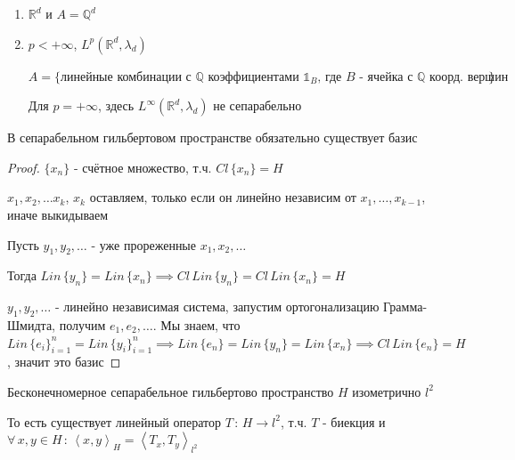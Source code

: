 \begin{example}
    \begin{enumerate}
        \item {
            $\mathbb{R}^d$ и $A = \mathbb{Q}^d$
        }
        \item {
            $p < +\infty$, $L^p (\mathbb{R}^d, \lambda_d)$

            $A = \{ \text{линейные комбинации с $\mathbb{Q}$ коэффициентами $\mathds{1}_B$, где $B$ - ячейка с $\mathbb{Q}$ коорд. вершин} \} $

            Для $p = +\infty$, здесь $L^\infty (\mathbb{R}^d, \lambda_d)$ не сепарабельно
        }
    \end{enumerate}
\end{example}

\begin{theorem}
    В сепарабельном гильбертовом пространстве обязательно существует базис
\end{theorem}

\begin{proof}
    $\{ x_n \}$ - счётное множество, т.ч. $Cl \, \{ x_n \} = H$

    $x_1, x_2, \ldots x_k$, $x_k$ оставляем, только если он линейно независим от $x_1, \ldots, x_{k - 1}$, иначе выкидываем

    Пусть $y_1, y_2, \ldots$ - уже прореженные $x_1, x_2, \ldots$

    Тогда $Lin \, \{ y_n \} = Lin \, \{ x_n \} \implies Cl \, Lin \, \{ y_n \} = Cl \, Lin \, \{ x_n \} = H$

    $y_1, y_2, \ldots$ - линейно независимая система, запустим ортогонализацию Грамма-Шмидта, получим $e_1, e_2, \ldots$.
    Мы знаем, что $Lin \, \{ e_i \}_{i = 1}^n = Lin \, \{ y_i \}_{i = 1}^n \implies Lin \, \{ e_n \} = Lin \, \{ y_n \} = Lin \, \{ x_n \} \implies Cl \, Lin \, \{e_n \} = H$, значит это базис
\end{proof}

\begin{theorem}
    Бесконечномерное сепарабельное гильбертово пространство $H$ изометрично $l^2$

    То есть существует линейный оператор $T \, : \, H \to l^2$, т.ч. $T$ - биекция и $\forall \, x, y \in H \, : \, \left < x, y \right >_H = \left < T_x, T_y \right >_{l^2}$
\end{theorem}

